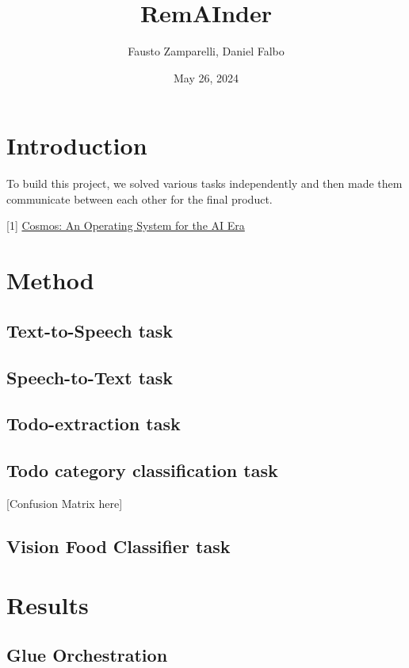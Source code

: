 \documentclass{article}
\title{RemAInder}
\author{Fausto Zamparelli, Daniel Falbo}
\date{May 26, 2024}
\begin{document}
\maketitle


\section*{Introduction}
To build this project, we solved various tasks independently and then made them communicate between each other for the final product.

[1] \href{https://humane.com/media/cosmos-an-operating-system-for-the-ai-era}{Cosmos: An Operating System for the AI Era}


\section*{Method}


\subsection*{Text-to-Speech task}

\subsection*{Speech-to-Text task}

\subsection*{Todo-extraction task}

\subsection*{Todo category classification task}

[Confusion Matrix here]

\subsection*{Vision Food Classifier task}


\section*{Results}

\subsection*{Glue Orchestration}
\end{document}
